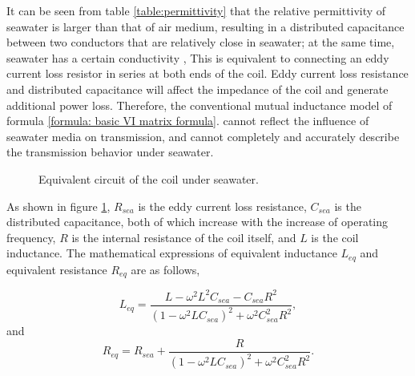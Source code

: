 It can be seen from table \ref{table:permittivity} that the relative permittivity of seawater is larger than that of air medium, resulting in a distributed capacitance between two conductors that are relatively close in seawater; at the same time, seawater has a certain conductivity , This is equivalent to connecting an eddy current loss resistor in series at both ends of the coil. Eddy current loss resistance and distributed capacitance will affect the impedance of the coil and generate additional power loss. Therefore, the conventional mutual inductance model of formula \ref{formula: basic VI matrix formula}. cannot reflect the influence of seawater media on transmission, and cannot completely and accurately describe the transmission behavior under seawater.


\begin{figure}[htbp]
    \centering
    \caption{Equivalent circuit of the coil under seawater.}
    \label{fig:coil under seawater}
\end{figure}

As shown in figure \ref{fig:coil under seawater}, $R_{sea}$ is the eddy current loss resistance, $C_{sea}$ is the distributed capacitance, both of which increase with the increase of operating frequency, $R$ is the internal resistance of the coil itself, and $L$ is the coil inductance. The mathematical expressions of equivalent inductance $L_{eq}$ and equivalent resistance $R_{eq}$ are as follows,

\begin{equation}
    L_{eq} = \frac{L-\omega ^2 L^2C_{sea}- C_{sea}R^2}{(1-\omega ^2 LC_{sea})^2 + \omega^2C_{sea}^2R^2},
    \label{formula: Leq}
\end{equation}
and
\begin{equation}
    R_{eq} = R_{sea} + \frac{R}{(1-\omega^2LC_{sea})^2+\omega^2C_{sea}^2R^2}.
    \label{formula: Req}
\end{equation}

